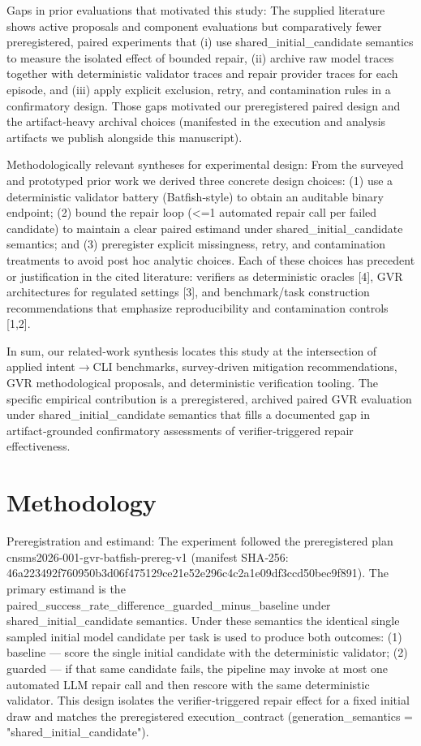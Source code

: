 \documentclass[conference]{IEEEtran}
\begin{document}
Gaps in prior evaluations that motivated this study: The supplied literature shows active proposals and component evaluations but comparatively fewer preregistered, paired experiments that (i) use shared\_initial\_candidate semantics to measure the isolated effect of bounded repair, (ii) archive raw model traces together with deterministic validator traces and repair provider traces for each episode, and (iii) apply explicit exclusion, retry, and contamination rules in a confirmatory design. Those gaps motivated our preregistered paired design and the artifact‑heavy archival choices (manifested in the execution and analysis artifacts we publish alongside this manuscript).

Methodologically relevant syntheses for experimental design: From the surveyed and prototyped prior work we derived three concrete design choices: (1) use a deterministic validator battery (Batfish‑style) to obtain an auditable binary endpoint; (2) bound the repair loop (<=1 automated repair call per failed candidate) to maintain a clear paired estimand under shared\_initial\_candidate semantics; and (3) preregister explicit missingness, retry, and contamination treatments to avoid post hoc analytic choices. Each of these choices has precedent or justification in the cited literature: verifiers as deterministic oracles [4], GVR architectures for regulated settings [3], and benchmark/task construction recommendations that emphasize reproducibility and contamination controls [1,2].

In sum, our related‑work synthesis locates this study at the intersection of applied intent\ensuremath{\rightarrow}CLI benchmarks, survey‑driven mitigation recommendations, GVR methodological proposals, and deterministic verification tooling. The specific empirical contribution is a preregistered, archived paired GVR evaluation under shared\_initial\_candidate semantics that fills a documented gap in artifact‑grounded confirmatory assessments of verifier‑triggered repair effectiveness.

\section{Methodology}
Preregistration and estimand: The experiment followed the preregistered plan cnsms2026-001-gvr-batfish-prereg-v1 (manifest SHA‑256: 46a22349\allowbreak{}2f760950\allowbreak{}b3d06f47\allowbreak{}5129ce21\allowbreak{}e52e296c\allowbreak{}4c2a1e09\allowbreak{}df3ccd50\allowbreak{}bec9f891). The primary estimand is the paired\_success\_rate\_difference\_guarded\_minus\_baseline under shared\_initial\_candidate semantics. Under these semantics the identical single sampled initial model candidate per task is used to produce both outcomes: (1) baseline --- score the single initial candidate with the deterministic validator; (2) guarded --- if that same candidate fails, the pipeline may invoke at most one automated LLM repair call and then rescore with the same deterministic validator. This design isolates the verifier‑triggered repair effect for a fixed initial draw and matches the preregistered execution\_contract (generation\_semantics = "shared\_initial\_candidate").
\end{document}
